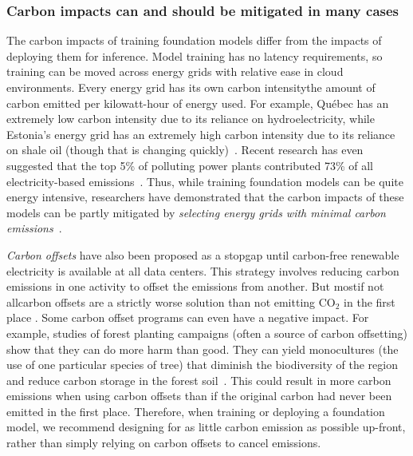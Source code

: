 \subsubsection{Carbon impacts can and should be mitigated in many cases}
\label{sec:environment-mitigation}
The  carbon impacts of training foundation models differ from the impacts of deploying them for inference.
Model training has no latency requirements, so  training  can be moved across energy grids with relative ease in cloud environments. 
Every energy grid has its own carbon intensity\dash{}the amount of carbon emitted per kilowatt-hour of energy used. For example, Qu\'ebec has an extremely low carbon intensity due to its reliance on hydroelectricity, while Estonia's energy grid has an extremely high carbon intensity due to its reliance on shale oil (though that is changing quickly)~\citep{henderson2020towards}.
Recent research has even suggested that the top 5\% of polluting power plants contributed 73\% of all electricity-based emissions~\citep{grant2021reducing}.
Thus, while training foundation models can be quite energy intensive, researchers have demonstrated that the carbon impacts of these models can be partly mitigated by \textit{selecting energy grids with minimal carbon emissions}~\citep{henderson2020towards,lacoste2019quantifying,patterson2021carbon}. 

\textit{Carbon offsets} have also been proposed as a stopgap until carbon-free renewable electricity is available at all data centers. This strategy involves reducing carbon emissions in one activity to offset the emissions from another. But most\dash{}if not all\dash{}carbon offsets are a strictly worse solution than not emitting CO$_{2}$ in the first place \cite{holl_tree_2020}. Some carbon offset programs can even have a negative impact. For example,  studies of forest planting campaigns (often a source of carbon offsetting) show that they can do more harm than good. They can yield monocultures (the use of one particular species of tree) that diminish the biodiversity of the region and reduce carbon storage in the forest soil~\citep{heilmayr2020impacts,hong2020divergent}. This could result in more carbon emissions when using carbon offsets than if the original carbon had never been emitted in the first place.
Therefore, when training or deploying a foundation model, we recommend designing for as little carbon emission as possible up-front, rather than simply relying on carbon offsets to cancel emissions.

